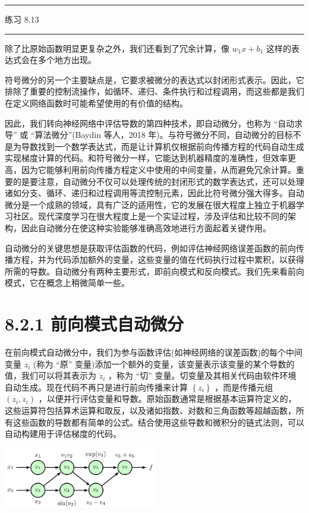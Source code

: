 \documentclass[10pt]{article}
\newcommand{\HRule}{\begin{center}\rule{0.9\linewidth}{0.2mm}\end{center}}
\begin{document}
\HRule

练习 8.13

\HRule

除了比原始函数明显更复杂之外，我们还看到了冗余计算，像 \({w}_{1}x + {b}_{1}\) 这样的表达式会在多个地方出现。

符号微分的另一个主要缺点是，它要求被微分的表达式以封闭形式表示。因此，它排除了重要的控制流操作，如循环、递归、条件执行和过程调用，而这些都是我们在定义网络函数时可能希望使用的有价值的结构。

因此，我们转向神经网络中评估导数的第四种技术，即自动微分，也称为 “自动求导” 或 “算法微分”(Baydin 等人，2018 年)。与符号微分不同，自动微分的目标不是为导数找到一个数学表达式，而是让计算机仅根据前向传播方程的代码自动生成实现梯度计算的代码。和符号微分一样，它能达到机器精度的准确性，但效率更高，因为它能够利用前向传播方程定义中使用的中间变量，从而避免冗余计算。重要的是要注意，自动微分不仅可以处理传统的封闭形式的数学表达式，还可以处理诸如分支、循环、递归和过程调用等流控制元素，因此比符号微分强大得多。自动微分是一个成熟的领域，具有广泛的适用性，它的发展在很大程度上独立于机器学习社区。现代深度学习在很大程度上是一个实证过程，涉及评估和比较不同的架构，因此自动微分在使这种实验能够准确高效地进行方面起着关键作用。

自动微分的关键思想是获取评估函数的代码，例如评估神经网络误差函数的前向传播方程，并为代码添加额外的变量，这些变量的值在代码执行过程中累积，以获得所需的导数。自动微分有两种主要形式，即前向模式和反向模式。我们先来看前向模式，它在概念上稍微简单一些。

\section*{8.2.1 前向模式自动微分}

在前向模式自动微分中，我们为参与函数评估(如神经网络的误差函数)的每个中间变量 \({z}_{i}\) (称为 “原” 变量)添加一个额外的变量，该变量表示该变量的某个导数的值，我们可以将其表示为 \({\dot{z}}_{i}\) ，称为 “切” 变量。切变量及其相关代码由软件环境自动生成。现在代码不再只是进行前向传播来计算 \(\left\{  {z}_{i}\right\}\) ，而是传播元组 \(\left( {{z}_{i},{\dot{z}}_{i}}\right)\) ，以便并行评估变量和导数。原始函数通常是根据基本运算符定义的，这些运算符包括算术运算和取反，以及诸如指数、对数和三角函数等超越函数，所有这些函数的导数都有简单的公式。结合使用这些导数和微积分的链式法则，可以自动构建用于评估梯度的代码。

\begin{center}
\includegraphics[max width=0.5\textwidth]{images/0194e279-9b28-703a-88f4-c3ac21e2010d_266_871_354_671_269_0.jpg}
\end{center}
\hspace*{3em} 
\end{document}
